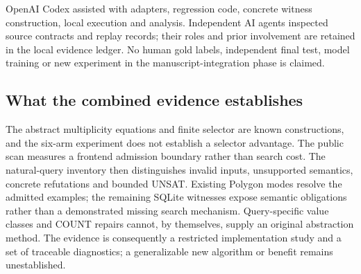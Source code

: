 OpenAI Codex assisted with adapters, regression code, concrete witness construction, local execution and analysis. Independent AI agents inspected source contracts and replay records; their roles and prior involvement are retained in the local evidence ledger. No human gold labels, independent final test, model training or new experiment in the manuscript-integration phase is claimed.

\subsection{What the combined evidence establishes}
The abstract multiplicity equations and finite selector are known constructions, and the six-arm experiment does not establish a selector advantage. The public scan measures a frontend admission boundary rather than search cost. The natural-query inventory then distinguishes invalid inputs, unsupported semantics, concrete refutations and bounded UNSAT. Existing Polygon modes resolve the admitted examples; the remaining SQLite witnesses expose semantic obligations rather than a demonstrated missing search mechanism. Query-specific value classes and COUNT repairs cannot, by themselves, supply an original abstraction method. The evidence is consequently a restricted implementation study and a set of traceable diagnostics; a generalizable new algorithm or benefit remains unestablished.
